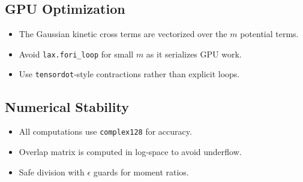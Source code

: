 \documentclass[11pt,a4paper]{article}
\theoremstyle{definition}
\begin{document}
\subsection{GPU Optimization}

\begin{itemize}
    \item The Gaussian kinetic cross terms are vectorized over the $m$ potential terms.
    \item Avoid \texttt{lax.fori\_loop} for small $m$ as it serializes GPU work.
    \item Use \texttt{tensordot}-style contractions rather than explicit loops.
\end{itemize}

\subsection{Numerical Stability}

\begin{itemize}
    \item All computations use \texttt{complex128} for accuracy.
    \item Overlap matrix is computed in log-space to avoid underflow.
    \item Safe division with $\epsilon$ guards for moment ratios.
\end{itemize}
\end{document}
